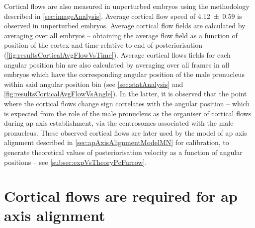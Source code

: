 Cortical flows are also measured in unperturbed embryos using the methodology described in \autoref{sec:imageAnalysis}. Average cortical flow speed of \SI{4.12 +- 0.59}{\unitCrtxVel} is observed in unperturbed embryos. Average cortical flow fields are calculated by averaging over all embryos -- obtaining the average flow field as a function of position of the cortex and time relative to end of posteriorisation (\autoref{fig:resultsCorticalAvgFlowVsTime}). Average cortical flows fields for each angular position bin are also calculated by averaging over all frames in all embryos which have the corresponding angular position of the male pronucleus within said angular position bin (see \autoref{sec:statAnalysis} and \autoref{fig:resultsCorticalAvgFlowVsAngle}). In the latter, it is observed that the point where the cortical flows change sign correlates with the angular position -- which is expected from the role of the male pronucleus as the organiser of cortical flows during \ac{ap} axis establishment, via the centrosomes associated with the male pronucleus. These observed cortical flows are later used by the model of \ac{ap} axis alignment described in \autoref{sec:apAxisAlignmentModelMN} for calibration, to generate theoretical values of posteriorisation velocity as a function of angular positions -- see \autoref{subsec:expVsTheoryPcFurrow}.

\FloatBarrier
\section{Cortical flows are required for \acs{ap} axis alignment}\label{sec:corticalFlowsRoleMlc4}

